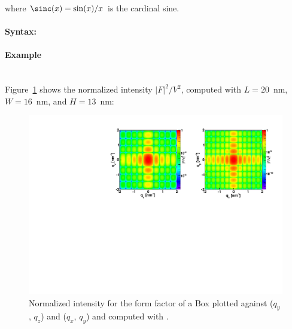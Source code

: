 where $\sinc(x)=\sin(x)/x$ is the cardinal sine.

\paragraph{Syntax:} 

\newpage

\paragraph{Example}\mbox{}\\
Figure~\ref{fig:FFBoxEx} shows the normalized intensity
$|F|^2/V^2$, computed with $L=20$~nm, $W=16$~nm, and $H=13$~nm:

\begin{figure}[ht]
\begin{center}
\includegraphics[angle=-90,width=\textwidth]{Figures/ff/figffbox.pdf}
\end{center}
\caption{Normalized intensity for the form factor of a Box plotted against ($q_y$, $q_z$) and  ($q_x$, $q_y$) and computed with .}
\label{fig:FFBoxEx}
\end{figure}

\FloatBarrier

